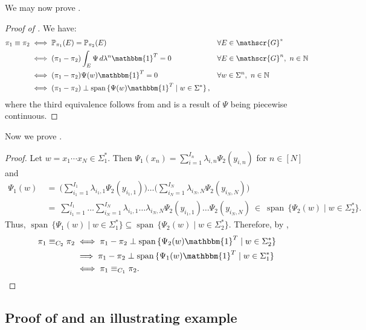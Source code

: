 \documentclass[a4paper,UKenglish,cleveref, autoref,mathscr]{lipics-v2019}
\newcommand{\NN}{\mathbb{N}}
\newcommand{\PP}{\mathbb{P}}
\newcommand{\GG}{\mathscr{G}}
\newcommand{\1}{\mathbbm{1}}
\DeclareMathOperator{\Span}{span\,}
\begin{document}
We may now prove .

\begin{proof}[Proof of ]
We have:
\begin{align*}
\pi_1 \equiv \pi_2 & \iff \PP_{\pi_1}(E) = \PP_{\pi_2}(E) & & \forall E \in \GG^* \\
& \iff (\pi_1 - \pi_2) \int_{E} \Psi\, d\lambda^n \1^T = 0 & & \forall E \in \GG^n,\ n \in \NN \\
& \iff (\pi_1 - \pi_2) \Psi(w) \1^T = 0 & & \forall w \in \Sigma^n,\ n \in \NN\\
& \iff (\pi_1 - \pi_2) \perp \Span \{\Psi(w) \1^T \mid w \in \Sigma^*\}\,,
\end{align*}
where the third equivalence follows from  and is a result of $\Psi$ being piecewise continuous.
\end{proof}

Now we prove .

\langequiv*

\begin{proof}
Let $w = x_1\cdots x_N \in \Sigma_1^*$.
Then $\Psi_1(x_n) = \sum_{i = 1}^{I_n} \lambda_{i,n} \Psi_2(y_{i,n})$ for $n \in [N]$ and
\begin{align*}
\Psi_1(w) & \ = \ \Big(\sum_{i_1 = 1}^{I_1} \lambda_{i_1,1} \Psi_2(y_{i_1,1}) \Big) \dots \Big(\sum_{i_N = 1}^{I_N} \lambda_{i_N,N} \Psi_2(y_{i_N,N}) \Big) \\
& \ = \ \sum_{i_1 = 1}^{I_1} \dots \sum_{i_N = 1}^{I_N} \lambda_{i_1, 1} \dots \lambda_{i_N,N} \Psi_2(y_{i_1, 1}) \dots \Psi_2(y_{i_N, N}) \ \in \ \Span \{ \Psi_2(w) \mid w \in \Sigma_2^*\}.
\end{align*}
Thus, $\Span \{\Psi_1(w) \mid w \in \Sigma_1^*\} \subseteq \Span \{\Psi_2(w) \mid w \in \Sigma_2^*\}$. Therefore, by ,
\begin{align*}
\pi_1 \equiv_{C_2} \pi_2 & \iff \pi_1 - \pi_2 \perp \Span \{\Psi_{2}(w) \1^T \mid w \in \Sigma_2^*\} \\
& \implies \pi_1 - \pi_2 \perp \Span \{\Psi_{1}(w) \1^T \mid w \in \Sigma_1^*\} \\
& \iff \pi_1 \equiv_{C_1} \pi_2. \tag*{\qedhere}
\end{align*}
\end{proof}

\subsection{Proof of  and an illustrating example}\label{appendixl12l13}
\end{document}

